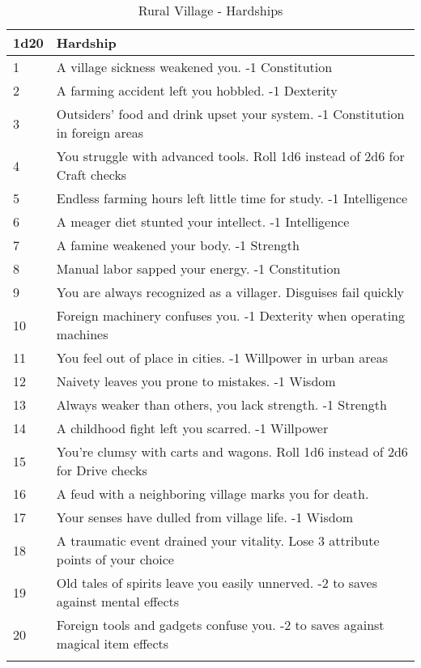 \documentclass[itdr/core]{subfiles}
\begin{document}
\begin{longtable}{p{}p{}}
\hline
\textbf{1d20} & \textbf{Hardship} \\
\hline
1 & A village sickness weakened you. -1 Constitution \\
2 & A farming accident left you hobbled. -1 Dexterity \\
3 & Outsiders' food and drink upset your system. -1 Constitution in foreign areas \\
4 & You struggle with advanced tools. Roll 1d6 instead of 2d6 for Craft checks \\
5 & Endless farming hours left little time for study. -1 Intelligence \\
6 & A meager diet stunted your intellect. -1 Intelligence \\
7 & A famine weakened your body. -1 Strength \\
8 & Manual labor sapped your energy. -1 Constitution \\
9 & You are always recognized as a villager. Disguises fail quickly \\
10 & Foreign machinery confuses you. -1 Dexterity when operating machines \\
11 & You feel out of place in cities. -1 Willpower in urban areas \\
12 & Naivety leaves you prone to mistakes. -1 Wisdom \\
13 & Always weaker than others, you lack strength. -1 Strength \\
14 & A childhood fight left you scarred. -1 Willpower \\
15 & You're clumsy with carts and wagons. Roll 1d6 instead of 2d6 for Drive checks \\
16 & A feud with a neighboring village marks you for death. \\
17 & Your senses have dulled from village life. -1 Wisdom \\
18 & A traumatic event drained your vitality. Lose 3 attribute points of your choice \\
19 & Old tales of spirits leave you easily unnerved. -2 to saves against mental effects \\
20 & Foreign tools and gadgets confuse you. -2 to saves against magical item effects \\
\hline
\caption{Rural Village - Hardships}
\label{table:rural-hardships}
\end{longtable}
\end{document}
